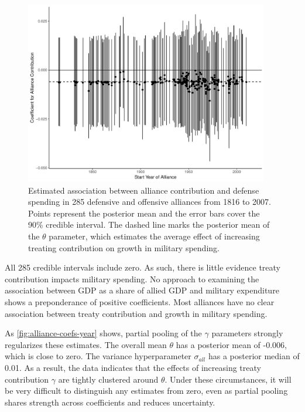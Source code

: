 \documentclass[12pt]{article}
\begin{document}
\begin{figure}[htbp]
	\centering
		\includegraphics[width=0.95\textwidth]{alliance-coefs-year.pdf}
	\caption{Estimated association between alliance contribution and defense spending in 285 defensive and offensive alliances from 1816 to 2007. Points represent the posterior mean and the error bars cover the 90\% credible interval. The dashed line marks the posterior mean of the $\theta$ parameter, which estimates the average effect of increasing treating contribution on growth in military spending.}
	\label{fig:alliance-coefs-year}
\end{figure}


All 285 credible intervals include zero. 
As such, there is little evidence treaty contribution impacts military spending. 
No approach to examining the association between GDP as a share of allied GDP and military expenditure shows a preponderance of positive coefficients. 
Most alliances have no clear association between treaty contribution and growth in military spending.


As \autoref{fig:alliance-coefs-year} shows, partial pooling of the $\gamma$ parameters strongly regularizes these estimates. 
The overall mean $\theta$ has a posterior mean of -0.006, which is close to zero. 
The variance hyperparameter $\sigma_{all}$ has a posterior median of 0.01. 
As a result, the data indicates that the effects of increasing treaty contribution $\gamma$ are tightly clustered around $\theta$. 
Under these circumstances, it will be very difficult to distinguish any estimates from zero, even as partial pooling shares strength across coefficients and reduces uncertainty. 
\end{document}
